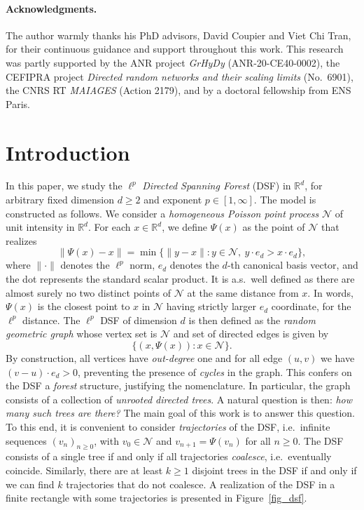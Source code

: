 \documentclass[a4paper, 11pt]{article}
\theoremstyle{plain}
\theoremstyle{definition}
\newcommand{\R}{\mathbb{R}}
\numberwithin{equation}{section}
\begin{document}
\paragraph{Acknowledgments.}
The author warmly thanks his PhD advisors, David Coupier and Viet Chi Tran, for their continuous guidance and support throughout this work. This research was partly supported by the ANR project \emph{GrHyDy} (ANR-20-CE40-0002), the CEFIPRA project \emph{Directed random networks and their scaling limits} (No.\ 6901), the CNRS RT \emph{MAIAGES} (Action 2179), and by a doctoral fellowship from ENS Paris.



\section{Introduction}


In this paper, we study the $\ell^p$ \emph{Directed Spanning Forest} (DSF) in $\R^d$, for arbitrary fixed dimension $d\geq 2$ and exponent $p\in[1, \infty]$. The model is constructed as follows. We consider a \emph{homogeneous Poisson point process} $\mathcal N$ of unit intensity in $\R^d$. For each $x\in\R^d$, we define $\Psi(x)$ as the point of $\mathcal N$ that realizes
    \[\|\Psi(x)-x\|=\min \{\|y-x\|:y\in\mathcal N,~y\cdot e_d>x\cdot e_d\},\]
where $\|\cdot\|$ denotes the $\ell^p$ norm, $e_d$ denotes the $d$-th canonical basis vector, and the dot represents the standard scalar product. It is a.s.\ well defined as there are almost surely no two distinct points of $\mathcal N$ at the same distance from $x$. In words, $\Psi(x)$ is the closest point to $x$ in $\mathcal N$ having strictly larger $e_d$ coordinate, for the $\ell^p$ distance. The $\ell^p$ DSF of dimension $d$ is then defined as the \emph{random geometric graph} whose vertex set is $\mathcal N$ and set of directed edges is given by
    \[\{(x,\Psi(x)):x\in\mathcal N\}.\]
By construction, all vertices have \emph{out-degree} one and for all edge $(u, v)$ we have $(v-u)\cdot e_d>0$, preventing the presence of \emph{cycles} in the graph. This confers on the DSF a \emph{forest} structure, justifying the nomenclature. In particular, the graph consists of a collection of \emph{unrooted directed trees}. A natural question is then: \emph{how many such trees are there?} The main goal of this work is to answer this question. To this end, it is convenient to consider \emph{trajectories} of the DSF, i.e.\ infinite sequences $(v_n)_{n\geq 0}$, with $v_0\in\mathcal N$ and $v_{n+1}=\Psi(v_n)$ for all $n\geq 0$. The DSF consists of a single tree if and only if all trajectories \emph{coalesce}, i.e.\ eventually coincide. Similarly, there are at least $k\geq 1$ disjoint trees in the DSF if and only if we can find $k$ trajectories that do not coalesce. A realization of the DSF in a finite rectangle with some trajectories is presented in Figure~\ref{fig_dsf}.
\end{document}
